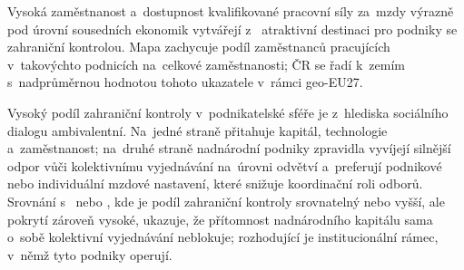 Vysoká zaměstnanost a~dostupnost kvalifikované pracovní síly za~mzdy výrazně pod úrovní sousedních ekonomik vytvářejí z~ atraktivní destinaci pro podniky se zahraniční kontrolou. Mapa zachycuje podíl zaměstnanců pracujících v~takovýchto podnicích na~celkové zaměstnanosti; \ac{ČR} se řadí k~zemím s~nadprůměrnou hodnotou tohoto ukazatele v~rámci \acs{geo-EU27}.

Vysoký podíl zahraniční kontroly v~podnikatelské sféře je z~hlediska sociálního dialogu ambivalentní. Na~jedné straně přitahuje kapitál, technologie a~zaměstnanost; na~druhé straně nadnárodní podniky zpravidla vyvíjejí silnější odpor vůči kolektivnímu vyjednávání na~úrovni odvětví a~preferují podnikové nebo individuální mzdové nastavení, které snižuje koordinační roli odborů. Srovnání s~ nebo , kde je podíl zahraniční kontroly srovnatelný nebo vyšší, ale pokrytí  zároveň vysoké, ukazuje, že přítomnost nadnárodního kapitálu sama o~sobě kolektivní vyjednávání neblokuje; rozhodující je institucionální rámec, v~němž tyto podniky operují.

